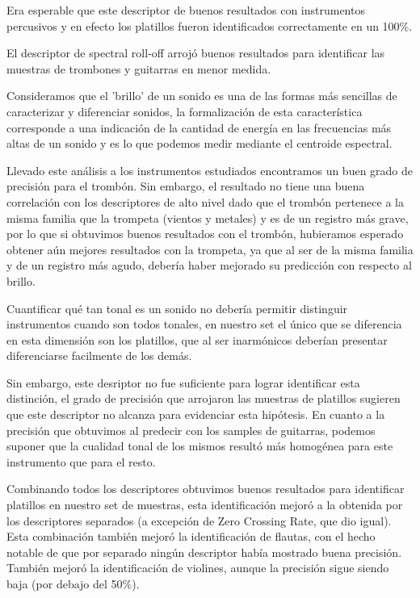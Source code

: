 
Era esperable que este descriptor de buenos resultados con instrumentos percusivos y en efecto los platillos fueron identificados correctamente en un 100\%.


El descriptor de spectral roll-off arrojó buenos resultados para identificar las muestras de trombones y guitarras en menor medida.


Consideramos que el 'brillo' de un sonido es una de las formas más sencillas de caracterizar y diferenciar sonidos, la formalización de esta característica corresponde a una indicación de la cantidad de energía en las frecuencias más altas de un sonido y es lo que podemos medir mediante el centroide espectral.

Llevado este análisis a los instrumentos estudiados encontramos un buen grado de precisión para el trombón. Sin embargo, el resultado no tiene una buena correlación con los descriptores de alto nivel dado que el trombón pertenece a la misma familia que la trompeta (vientos y metales) y es de un registro más grave, por lo que si obtuvimos buenos resultados con el trombón, hubieramos esperado obtener aún mejores resultados con la trompeta, ya que al ser de la misma familia y de un registro más agudo, debería haber mejorado su predicción con respecto al brillo.


Cuantificar qué tan tonal es un sonido no debería permitir distinguir instrumentos cuando son todos tonales, en nuestro set el único que se diferencia en esta dimensión son los platillos, que al ser inarmónicos deberían presentar diferenciarse facilmente de los demás.

Sin embargo, este desriptor no fue suficiente para lograr identificar esta distinción, el grado de precisión que arrojaron las muestras de platillos sugieren que este descriptor no alcanza para evidenciar esta hipótesis. En cuanto a la precisión que obtuvimos al predecir con los samples de guitarras, podemos suponer que la cualidad tonal de los mismos resultó más homogénea para este instrumento que para el resto.


Combinando todos los descriptores obtuvimos buenos resultados para identificar platillos en nuestro set de muestras, esta identificación mejoró a la obtenida por los descriptores separados (a excepción de Zero Crossing Rate, que dio igual). Esta combinación también mejoró la identificación de flautas, con el hecho notable de que por separado ningún descriptor había mostrado buena precisión. También mejoró la identificación de violines, aunque la precisión sigue siendo baja (por debajo del 50\%).

